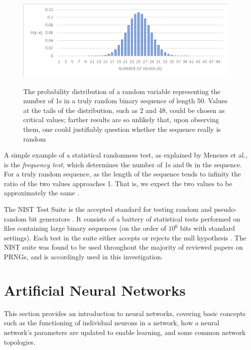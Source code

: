 \documentclass[12pt, titlepage]{report}
\theoremstyle{definition}
\begin{document}
\begin{figure}
    \centering
    \includegraphics[width=1\textwidth]{img/distribution.png}\\
    \caption{The probability distribution of a random variable representing the number of 1s in a truly random binary sequence of length 50. Values at the tails of the distribution, such as 2 and 48, could be chosen as critical values; farther results are so unlikely that, upon observing them, one could justifiably question whether the sequence really is random}
    \label{figure:distribution}
\end{figure}

A simple example of a statistical randomness test, as explained by Menezes et al., is the \emph{frequency test}, which determines the number of 1s and 0s in the sequence. For a truly random sequence, as the length of the sequence tends to infinity the ratio of the two values approaches 1. That is, we expect the two values to be approximately the same \cite[p. 181]{menezes1996handbook}.

The NIST Test Suite is the accepted standard for testing random and pseudo-random bit generators \cite{lavasani2009practical}. It consists of a battery of statistical tests performed on files containing large binary sequences (on the order of $10^6$ bits with standard settings). Each test in the suite either accepts or rejects the null hypothesis \cite{rukhin2001statistical}. The NIST suite was found to be used throughout the majority of reviewed papers on PRNGs, and is accordingly used in this investigation.




\section{Artificial Neural Networks}
This section provides an introduction to neural networks, covering basic concepts such as the functioning of individual neurons in a network, how a neural network's parameters are updated to enable learning, and some common network topologies.
\end{document}
